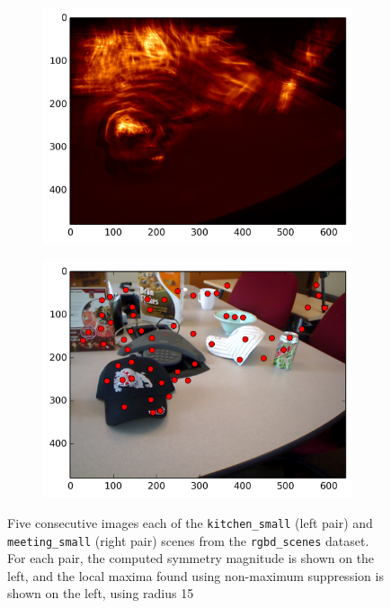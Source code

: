 \begin{figure}[ht]
\begin{subfigure}[]{0.25\linewidth}\label{fig:meet_smag_4}\includegraphics[width=\linewidth]{figures/meeting_smag_9}\end{subfigure}%
\begin{subfigure}[]{0.25\linewidth}\label{fig:meet_feats_4}\includegraphics[width=\linewidth]{figures/meeting_feats_9}\end{subfigure}
\caption{Five consecutive images each of the \texttt{kitchen\_small} (left pair) and \texttt{meeting\_small} (right pair) scenes from the \texttt{rgbd\_scenes} dataset\cite{henry_rgb-d_2012}. For each pair, the computed symmetry magnitude is shown on the left, and the local maxima found using non-maximum suppression is shown on the left, using radius 15}
\label{fig:ex_xforms}
\end{figure}


